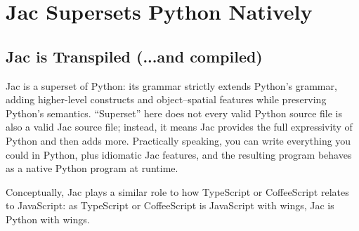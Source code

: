 \chapter{Jac Supersets Python Natively}
\section{Jac is Transpiled (...and compiled)}
Jac is a superset of Python: its grammar strictly extends Python's grammar, adding higher-level constructs and object–spatial features while preserving Python's semantics. ``Superset'' here does not every valid Python source file is also a valid Jac source file; instead, it means Jac provides the full expressivity of Python and then adds more. Practically speaking, you can write everything you could in Python, plus idiomatic Jac features, and the resulting program behaves as a native Python program at runtime.

Conceptually, Jac plays a similar role to how TypeScript or CoffeeScript relates to JavaScript: as TypeScript or CoffeeScript is JavaScript with wings, Jac is Python with wings.



